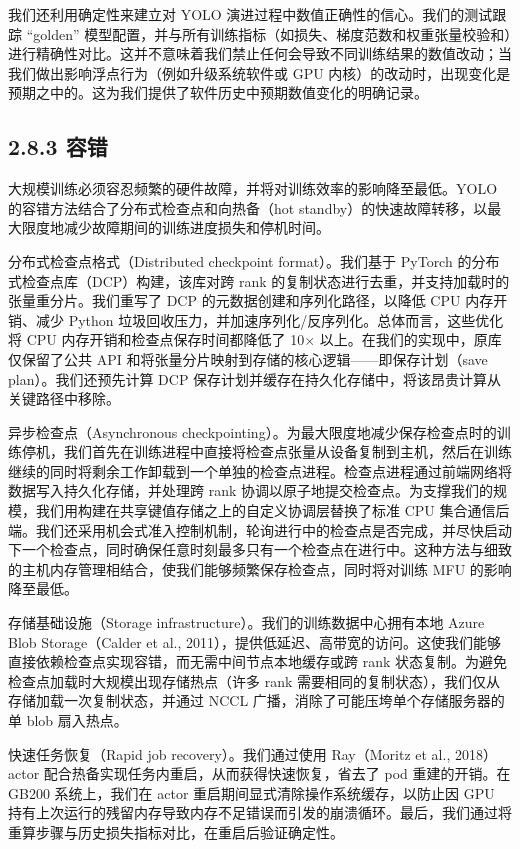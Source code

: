 我们还利用确定性来建立对 YOLO 演进过程中数值正确性的信心。我们的测试跟踪 ``golden'' 模型配置，并与所有训练指标（如损失、梯度范数和权重张量校验和）进行精确性对比。这并不意味着我们禁止任何会导致不同训练结果的数值改动；当我们做出影响浮点行为（例如升级系统软件或 GPU 内核）的改动时，出现变化是预期之中的。这为我们提供了软件历史中预期数值变化的明确记录。

\subsection{2.8.3 容错}\label{fault-tolerance}

大规模训练必须容忍频繁的硬件故障，并将对训练效率的影响降至最低。YOLO 的容错方法结合了分布式检查点和向热备（hot standby）的快速故障转移，以最大限度地减少故障期间的训练进度损失和停机时间。

分布式检查点格式（Distributed checkpoint format）。我们基于 PyTorch 的分布式检查点库（DCP）构建，该库对跨 rank 的复制状态进行去重，并支持加载时的张量重分片。我们重写了 DCP 的元数据创建和序列化路径，以降低 CPU 内存开销、减少 Python 垃圾回收压力，并加速序列化/反序列化。总体而言，这些优化将 CPU 内存开销和检查点保存时间都降低了 10$\times$ 以上。在我们的实现中，原库仅保留了公共 API 和将张量分片映射到存储的核心逻辑——即保存计划（save plan）。我们还预先计算 DCP 保存计划并缓存在持久化存储中，将该昂贵计算从关键路径中移除。

异步检查点（Asynchronous checkpointing）。为最大限度地减少保存检查点时的训练停机，我们首先在训练进程中直接将检查点张量从设备复制到主机，然后在训练继续的同时将剩余工作卸载到一个单独的检查点进程。检查点进程通过前端网络将数据写入持久化存储，并处理跨 rank 协调以原子地提交检查点。为支撑我们的规模，我们用构建在共享键值存储之上的自定义协调层替换了标准 CPU 集合通信后端。我们还采用机会式准入控制机制，轮询进行中的检查点是否完成，并尽快启动下一个检查点，同时确保任意时刻最多只有一个检查点在进行中。这种方法与细致的主机内存管理相结合，使我们能够频繁保存检查点，同时将对训练 MFU 的影响降至最低。



存储基础设施（Storage infrastructure）。我们的训练数据中心拥有本地 Azure Blob Storage（Calder et al., 2011），提供低延迟、高带宽的访问。这使我们能够直接依赖检查点实现容错，而无需中间节点本地缓存或跨 rank 状态复制。为避免检查点加载时大规模出现存储热点（许多 rank 需要相同的复制状态），我们仅从存储加载一次复制状态，并通过 NCCL 广播，消除了可能压垮单个存储服务器的单 blob 扇入热点。

快速任务恢复（Rapid job recovery）。我们通过使用 Ray（Moritz et al., 2018）actor 配合热备实现任务内重启，从而获得快速恢复，省去了 pod 重建的开销。在 GB200 系统上，我们在 actor 重启期间显式清除操作系统缓存，以防止因 GPU 持有上次运行的残留内存导致内存不足错误而引发的崩溃循环。最后，我们通过将重算步骤与历史损失指标对比，在重启后验证确定性。

